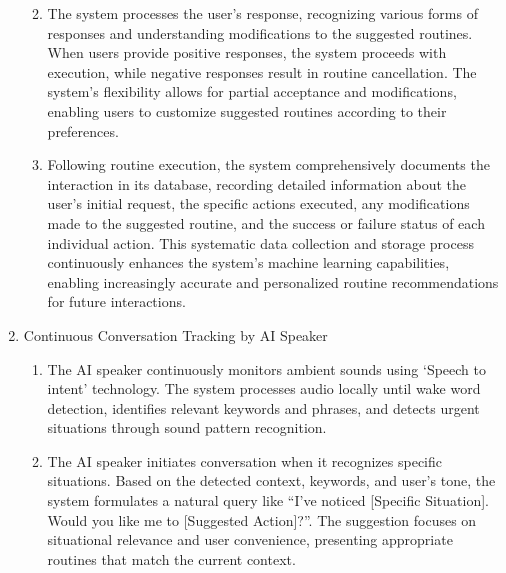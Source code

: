 \documentclass[conference]{IEEEtran}
\begin{document}
\begin{enumerate}[label=\arabic*]
\begin{enumerate}[label=\arabic*)]
        \vspace{0.5em}

        \item The system processes the user's response, recognizing various forms of responses and understanding modifications to the suggested routines. When users provide positive responses, the system proceeds with execution, while negative responses result in routine cancellation. The system's flexibility allows for partial acceptance and modifications, enabling users to customize suggested routines according to their preferences.

        \vspace{0.5em}

        \item Following routine execution, the system comprehensively documents the interaction in its database, recording detailed information about the user's initial request, the specific actions executed, any modifications made to the suggested routine, and the success or failure status of each individual action. This systematic data collection and storage process continuously enhances the system's machine learning capabilities, enabling increasingly accurate and personalized routine recommendations for future interactions.
    \end{enumerate}

    \vspace{1em}

    \item Continuous Conversation Tracking  by AI Speaker\par
    \vspace{0.3em}

    \begin{enumerate}[label=\arabic*)]
        \item The AI speaker continuously monitors ambient sounds using ‘Speech to intent’ technology. The system processes audio locally until wake word detection, identifies relevant keywords and phrases, and detects urgent situations through sound pattern recognition.

        \vspace{0.5em}

        \item The AI speaker initiates conversation when it recognizes specific situations. Based on the detected context, keywords, and user's tone, the system formulates a natural query like “I've noticed [Specific Situation]. Would you like me to [Suggested Action]?”. The suggestion focuses on situational relevance and user convenience, presenting appropriate routines that match the current context.


\end{enumerate}
\end{enumerate}
\end{document}
